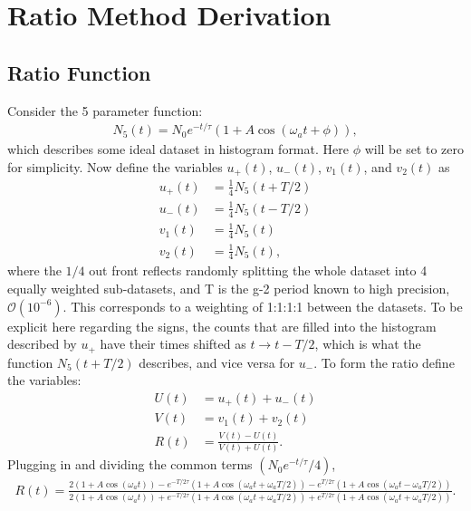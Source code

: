 
\thispagestyle{myheadings}

\chapter{Ratio Method Derivation}
\label{RatioDerivation}

\section{Ratio Function}

Consider the 5 parameter function:
	\begin{align}
		N_{5}(t) = N_{0}e^{-t/\tau}(1 + A \cos(\omega_{a}t + \phi)),
	\end{align}
which describes some ideal dataset in histogram format. Here $\phi$ will be set to zero for simplicity. Now define the variables $u_{+}(t)$, $u_{-}(t)$, $v_{1}(t)$, and $v_{2}(t)$ as
	\begin{equation}
	\begin{aligned}
		u_{+}(t) &= \frac{1}{4} N_{5}(t+T/2) \\
		u_{-}(t) &= \frac{1}{4} N_{5}(t-T/2) \\
		v_{1}(t) &= \frac{1}{4} N_{5}(t) \\
		v_{2}(t) &= \frac{1}{4} N_{5}(t),
	\end{aligned}
	\end{equation}
where the $1/4$ out front reflects randomly splitting the whole dataset into 4 equally weighted sub-datasets, and T is the g-2 period known to high precision, $\mathcal{O}(10^{-6})$. This corresponds to a weighting of 1:1:1:1 between the datasets. To be explicit here regarding the signs, the counts that are filled into the histogram described by $u_{+}$ have their times shifted as $t \rightarrow t - T/2$, which is what the function $N_{5}(t+T/2)$ describes, and vice versa for $u_{-}$. To form the ratio define the variables:
	\begin{equation}
	\begin{aligned}
		U(t) &= u_{+}(t) + u_{-}(t) \\
		V(t) &= v_{1}(t) + v_{2}(t) \\
		R(t) &= \frac{V(t) - U(t)}{V(t) + U(t)}.
	\label{eq:ratio}
	\end{aligned}
	\end{equation}
Plugging in and dividing the common terms $(N_{0}e^{-t/\tau}/4)$,
	\begin{align}
		R(t) = \frac{2(1 + A \cos(\omega_{a}t)) - e^{-T/ 2\tau} (1 + A \cos(\omega_{a}t + \omega_{a}T/2)) - e^{T/ 2\tau} (1 + A \cos(\omega_{a}t - \omega_{a}T/2))} {2(1 + A \cos(\omega_{a}t)) + e^{-T/ 2\tau} (1 + A \cos(\omega_{a}t + \omega_{a}T/2)) + e^{T/ 2\tau} (1 + A \cos(\omega_{a}t + \omega_{a}T/2))}.
	\end{align}

